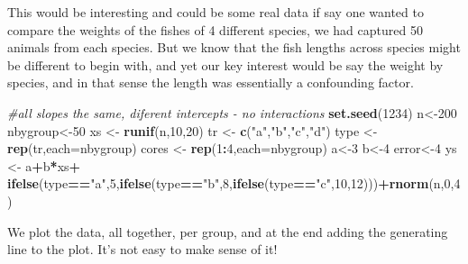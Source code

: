 \documentclass[
]{book}
\newenvironment{Shaded}{\begin{snugshade}}{\end{snugshade}}
\newcommand{\CommentTok}[1]{\textcolor[rgb]{0.56,0.35,0.01}{\textit{#1}}}
\newcommand{\DataTypeTok}[1]{\textcolor[rgb]{0.13,0.29,0.53}{#1}}
\newcommand{\DecValTok}[1]{\textcolor[rgb]{0.00,0.00,0.81}{#1}}
\newcommand{\KeywordTok}[1]{\textcolor[rgb]{0.13,0.29,0.53}{\textbf{#1}}}
\newcommand{\NormalTok}[1]{#1}
\newcommand{\OperatorTok}[1]{\textcolor[rgb]{0.81,0.36,0.00}{\textbf{#1}}}
\newcommand{\StringTok}[1]{\textcolor[rgb]{0.31,0.60,0.02}{#1}}
\begin{document}
This would be interesting and could be some real data if say one wanted to compare the weights of the fishes of 4 different species, we had captured 50 animals from each species. But we know that the fish lengths across species might be different to begin with, and yet our key interest would be say the weight by species, and in that sense the length was essentially a confounding factor.

\begin{Shaded}
\begin{Highlighting}[]
\CommentTok{#all slopes the same, diferent intercepts - no interactions}
\KeywordTok{set.seed}\NormalTok{(}\DecValTok{1234}\NormalTok{)}
\NormalTok{n<-}\DecValTok{200}
\NormalTok{nbygroup<-}\DecValTok{50}
\NormalTok{xs <-}\StringTok{ }\KeywordTok{runif}\NormalTok{(n,}\DecValTok{10}\NormalTok{,}\DecValTok{20}\NormalTok{)}
\NormalTok{tr <-}\StringTok{ }\KeywordTok{c}\NormalTok{(}\StringTok{"a"}\NormalTok{,}\StringTok{"b"}\NormalTok{,}\StringTok{"c"}\NormalTok{,}\StringTok{"d"}\NormalTok{)}
\NormalTok{type <-}\StringTok{ }\KeywordTok{rep}\NormalTok{(tr,}\DataTypeTok{each=}\NormalTok{nbygroup)}
\NormalTok{cores <-}\StringTok{ }\KeywordTok{rep}\NormalTok{(}\DecValTok{1}\OperatorTok{:}\DecValTok{4}\NormalTok{,}\DataTypeTok{each=}\NormalTok{nbygroup)}
\NormalTok{a<-}\DecValTok{3}
\NormalTok{b<-}\DecValTok{4}
\NormalTok{error<-}\DecValTok{4}
\NormalTok{ys <-}\StringTok{ }\NormalTok{a}\OperatorTok{+}\NormalTok{b}\OperatorTok{*}\NormalTok{xs}\OperatorTok{+}
\KeywordTok{ifelse}\NormalTok{(type}\OperatorTok{==}\StringTok{"a"}\NormalTok{,}\DecValTok{5}\NormalTok{,}\KeywordTok{ifelse}\NormalTok{(type}\OperatorTok{==}\StringTok{"b"}\NormalTok{,}\DecValTok{8}\NormalTok{,}\KeywordTok{ifelse}\NormalTok{(type}\OperatorTok{==}\StringTok{"c"}\NormalTok{,}\DecValTok{10}\NormalTok{,}\DecValTok{12}\NormalTok{)))}\OperatorTok{+}\KeywordTok{rnorm}\NormalTok{(n,}\DecValTok{0}\NormalTok{,}\DecValTok{4}\NormalTok{)}
\end{Highlighting}
\end{Shaded}

We plot the data, all together, per group, and at the end adding the generating line to the plot. It's not easy to make sense of it!
\end{document}
